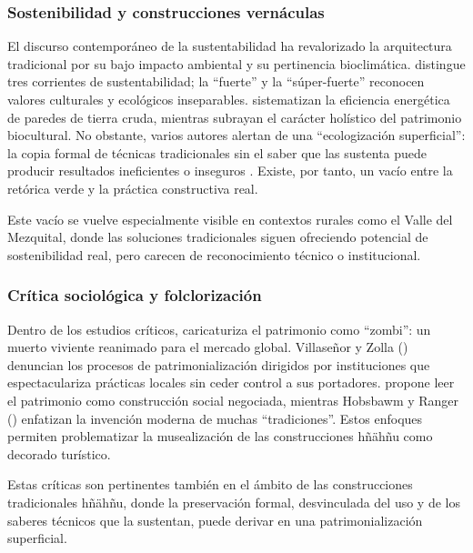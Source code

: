 \subsubsection{Sostenibilidad y construcciones vernáculas}

El discurso contemporáneo de la sustentabilidad ha revalorizado la arquitectura tradicional por su bajo impacto ambiental y su pertinencia bioclimática. \cite{gudynas2010desarrollo} distingue tres corrientes de sustentabilidad; la ``fuerte'' y la ``súper-fuerte'' reconocen valores culturales y ecológicos inseparables. \cite{larraga2014sust} sistematizan la eficiencia energética de paredes de tierra cruda, mientras \cite{chang2010patrimonio} subrayan el carácter holístico del patrimonio biocultural.  No obstante, varios autores alertan de una ``ecologización superficial'': la copia formal de técnicas tradicionales sin el saber que las sustenta puede producir resultados ineficientes o inseguros \cite{gandara2000, sanchez2016adobeBTC}.  Existe, por tanto, un vacío entre la retórica verde y la práctica constructiva real.

Este vacío se vuelve especialmente visible en contextos rurales como el Valle del Mezquital, donde las soluciones tradicionales siguen ofreciendo potencial de sostenibilidad real, pero carecen de reconocimiento técnico o institucional.

\subsubsection{Crítica sociológica y folclorización}

Dentro de los estudios críticos, \cite{i2008zombi} caricaturiza el patrimonio como ``zombi'': un muerto viviente reanimado para el mercado global.  Villaseñor y Zolla (\citeyear{villasenor2012patrimonio}) denuncian los procesos de patrimonialización dirigidos por instituciones que espectaculariza prácticas locales sin ceder control a sus portadores. \cite{malavassi2017patrimonio} propone leer el patrimonio como construcción social negociada, mientras Hobsbawm y Ranger (\citeyear{hobsbawm1983inventar}) enfatizan la invención moderna de muchas ``tradiciones''.  Estos enfoques permiten problematizar la musealización de las construcciones hñähñu como decorado turístico.

Estas críticas son pertinentes también en el ámbito de las construcciones tradicionales hñähñu, donde la preservación formal, desvinculada del uso y de los saberes técnicos que la sustentan, puede derivar en una patrimonialización superficial.

